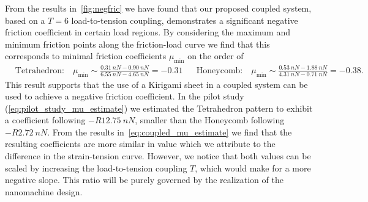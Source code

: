 From the results in~\cref{fig:negfric} we have found that our proposed coupled system, based on a $T = 6$ load-to-tension coupling, demonstrates a significant negative friction coefficient in certain load regions. By considering the
maximum and minimum friction points along the friction-load curve we find that
this corresponds to minimal friction coefficients $\mu_{\min}$ on the order of
\begin{align}
  &\text{Tetrahedron:} \quad \mu_{\min} \sim \frac{\SI{0.31}{nN} - \SI{0.90}{nN}}{\SI{6.55}{nN} - \SI{4.65}{nN}} = -0.31& 
  &\text{Honeycomb:} \quad \mu_{\min} \sim \frac{\SI{0.53}{nN} - \SI{1.88}{nN}}{\SI{4.31}{nN} - \SI{0.71}{nN}} = -0.38.&
  \label{eq:coupled_mu_estimate}
\end{align}
This result supports that the use of a Kirigami sheet in a coupled system can be used to achieve a negative friction coefficient. In the pilot study (\cref{eq:pilot_study_mu_estimate}) we estimated the Tetrahedron pattern to exhibit a coefficient following $-R \SI{12.75}{nN}$, smaller than the Honeycomb following $-R \SI{2.72}{nN}$. From the results in~\cref{eq:coupled_mu_estimate} we find that the resulting coefficients are more similar in value which we attribute to the difference in the strain-tension curve. However, we notice that both values can be scaled by increasing the load-to-tension coupling $T$, which would make for a more negative slope. This ratio will be purely governed by the realization of the nanomachine design. 